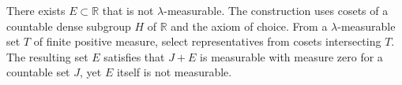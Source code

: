 There exists $E \subset \mathbb{R}$ that is not $\lambda$-measurable. The construction uses cosets of a countable dense subgroup $H$ of $\mathbb{R}$ and the axiom of choice. From a $\lambda$-measurable set $T$ of finite positive measure, select representatives from cosets intersecting $T$. The resulting set $E$ satisfies that $J + E$ is measurable with measure zero for a countable set $J$, yet $E$ itself is not measurable.